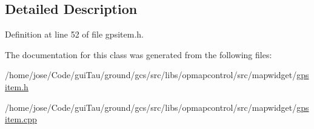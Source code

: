 \subsection{Detailed Description}


Definition at line 52 of file gpsitem.\-h.



The documentation for this class was generated from the following files\-:\begin{DoxyCompactItemize}
\item 
/home/jose/\-Code/gui\-Tau/ground/gcs/src/libs/opmapcontrol/src/mapwidget/\hyperlink{gpsitem_8h}{gpsitem.\-h}\item 
/home/jose/\-Code/gui\-Tau/ground/gcs/src/libs/opmapcontrol/src/mapwidget/\hyperlink{gpsitem_8cpp}{gpsitem.\-cpp}\end{DoxyCompactItemize}
